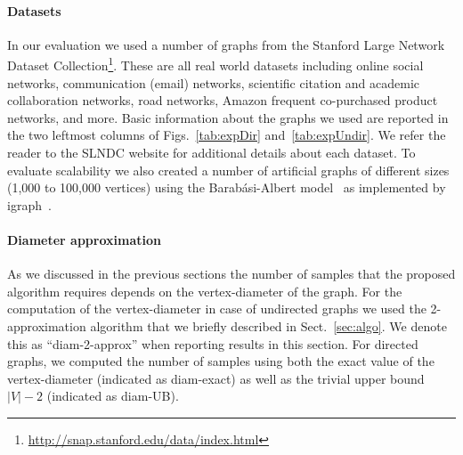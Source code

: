 \paragraph{Datasets} In our evaluation we used a number of graphs from the
Stanford Large Network Dataset
Collection\footnote{\url{http://snap.stanford.edu/data/index.html}}. These are
all real world datasets including online social networks, communication (email)
networks, scientific citation and academic collaboration networks, road
networks, Amazon frequent co-purchased product networks, and more. Basic
information about the graphs we used are reported in the two leftmost columns 
of Figs.~\ref{tab:expDir} and~\ref{tab:expUndir}. We refer the
reader to the SLNDC website for additional details about each dataset. 
To evaluate scalability we also created a number of artificial graphs of
different sizes (1,000 to 100,000 vertices) using the Barab\'asi-Albert
model~\citep{BarabasiA99} as implemented by igraph~\citep{igraph}. 

\paragraph{Diameter approximation}
As we discussed in the previous sections the number of samples that the proposed
algorithm requires depends on the vertex-diameter of the graph. 
For the computation of the vertex-diameter in case of undirected graphs we used
the 2-approximation algorithm that we briefly described in Sect.~\ref{sec:algo}.
We denote this as ``diam-2-approx'' when reporting results in this section. For
directed graphs, we computed the number of samples using both the exact value of
the vertex-diameter (indicated as diam-exact) as well as the trivial upper bound
$|V|-2$ (indicated as diam-UB). 


